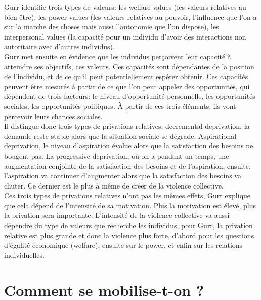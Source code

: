 \documentclass[10pt, a4paper, openany]{book}
\begin{document}
Gurr identifie trois types de valeurs: les welfare values (les valeurs relatives au bien être), les power values (les valeurs relatives au pouvoir, l'influence que l'on a sur la marche des choses mais aussi l'autonomie que l'on dispose), les interpersonal values (la capacité pour un individu d'avoir des interactions non autoritaire avec d'autres individus). \\
Gurr met ensuite en évidence que les individus perçoivent leur capacité à atteindre ses objectifs, ces valeurs. Ces capacités sont dépendantes de la position de l'individu, et de ce qu'il peut potentiellement espérer obtenir. Ces capacités peuvent être mesurés à partir de ce que l'on peut appeler des opportunités, qui dépendent de trois facteurs: le niveau d'opportunité personnelle, les opportunités sociales, les opportunités politiques. À partir de ces trois éléments, ils vont percevoir leurs chances sociales. \\
Il distingue donc trois types de privations relatives: decremental deprivation, la demande reste stable alors que la situation sociale se dégrade. Aspirational deprivation, le niveau d'aspiration évolue alors que la satisfaction des besoins ne bougent pas. La progressive deprivation, où on a pendant un temps, une augmentation conjointe de la satisfaction des besoins et de l'aspiration, ensuite, l'aspiration va continuer d'augmenter alors que la satisfaction des besoins va chuter. Ce dernier est le plus à même de créer de la violence collective. \\
Ces trois types de privations relatives n'ont pas les mêmes effets, Gurr explique que cela dépend de l'intensité de sa motivation. Plus la motivation est élevé, plus la privation sera importante. L'intensité de la violence collective va aussi dépendre du type de valeurs que recherche les individus, pour Gurr, la privation relative est plus grande et donc la violence plus forte, d'abord pour les questions d'égalité économique (welfare), ensuite sur le power, et enfin sur les relations individuelles. 























\part{Comment se mobilise-t-on ?}
\end{document}
